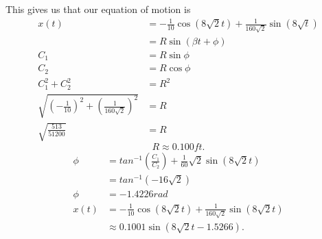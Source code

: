 \begin{eg}
    This gives us that our equation of motion is 
    \begin{align*}
      x(t)&=-\frac{1}{10}\cos\left( 8\sqrt{2} t \right) +\frac{1}{160\sqrt{2} }\sin\left( 8\sqrt{t}  \right) \\
          &=R\sin\left( \beta t+\phi \right) \\
      C_1&=R\sin\phi\\
      C_2&=R\cos\phi\\
      C_1^2+C_2^2&=R^2\\
      \sqrt{\left( -\frac{1}{10} \right) ^2+\left( \frac{1}{160\sqrt{2} } \right) ^2} &= R\\
      \sqrt{\frac{513}{51200}} &=R
    \end{align*}
    \[
      \boxed{R\approx0.100ft}
    .\] 
    \begin{align*}
      \phi&=tan^{-1}\left( \frac{C_1}{C_2} \right)+\frac{1}{60}\sqrt{2} \sin(8\sqrt{2} t) \\
          &=tan^{-1}\left( -16\sqrt{2}  \right) \\
      \phi&=-1.4226rad\\
      x(t)&= -\frac{1}{10}\cos\left( 8\sqrt{2}t  \right)+\frac{1}{160\sqrt{2} }\sin\left( 8\sqrt{2}t  \right) \\
          &\approx 0.1001\sin\left( 8\sqrt{2} t-1.5266 \right) 
    .\end{align*}
  \end{eg}

